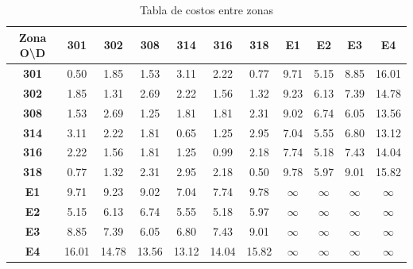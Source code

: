 \documentclass[letterpaper,12pt]{article}
\begin{document}
\begin{table}[h!]
    \centering
    \begin{tabular}{c|cccccccccc}
    \textbf{Zona O\textbackslash D} & \textbf{301} & \textbf{302} & \textbf{308} & \textbf{314} & \textbf{316} & \textbf{318} & \textbf{E1} & \textbf{E2} & \textbf{E3} & \textbf{E4} \\ \hline
    \textbf{301} & 0.50 & 1.85 & 1.53 & 3.11 & 2.22 & 0.77 & 9.71 & 5.15 & 8.85 & 16.01 \\ 
    \textbf{302} & 1.85 & 1.31 & 2.69 & 2.22 & 1.56 & 1.32 & 9.23 & 6.13 & 7.39 & 14.78 \\ 
    \textbf{308} & 1.53 & 2.69 & 1.25 & 1.81 & 1.81 & 2.31 & 9.02 & 6.74 & 6.05 & 13.56 \\ 
    \textbf{314} & 3.11 & 2.22 & 1.81 & 0.65 & 1.25 & 2.95 & 7.04 & 5.55 & 6.80 & 13.12 \\ 
    \textbf{316} & 2.22 & 1.56 & 1.81 & 1.25 & 0.99 & 2.18 & 7.74 & 5.18 & 7.43 & 14.04 \\ 
    \textbf{318} & 0.77 & 1.32 & 2.31 & 2.95 & 2.18 & 0.50 & 9.78 & 5.97 & 9.01 & 15.82 \\ 
    \textbf{E1} & 9.71 & 9.23 & 9.02 & 7.04 & 7.74 & 9.78 & $\infty$ & $\infty$ & $\infty$ & $\infty$ \\ 
    \textbf{E2} & 5.15 & 6.13 & 6.74 & 5.55 & 5.18 & 5.97 & $\infty$ & $\infty$ & $\infty$ & $\infty$ \\ 
    \textbf{E3} & 8.85 & 7.39 & 6.05 & 6.80 & 7.43 & 9.01 & $\infty$ & $\infty$ & $\infty$ & $\infty$ \\ 
    \textbf{E4} & 16.01 & 14.78 & 13.56 & 13.12 & 14.04 & 15.82 & $\infty$ & $\infty$ & $\infty$ & $\infty$ \\ 
    \end{tabular}
    \caption{Tabla de costos entre zonas}
    \label{table:costs_zones}
\end{table}
    
\end{document}
